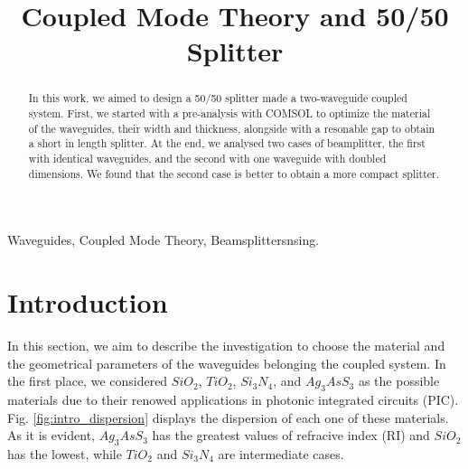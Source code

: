 \documentclass[conference, a4paper]{IEEEtran}
\begin{document}
\title{Coupled Mode Theory and 50/50 Splitter}

\author{
\and
{}
}

\maketitle

\begin{abstract}
    In this work, we aimed to design a 50/50 splitter made a two-waveguide coupled system. First, we started with a pre-analysis with COMSOL to optimize the material of the waveguides, their width and thickness, alongside with a resonable gap to obtain a short in length splitter. At the end, we analysed two cases of beamplitter, the first with identical waveguides, and the second with one waveguide with doubled dimensions. We found that the second case is better to obtain a more compact splitter.
\end{abstract}

\begin{IEEEkeywords}
    Waveguides, Coupled Mode Theory, Beamsplittersnsing.
\end{IEEEkeywords}

\section{Introduction}
\label{sec:intro}

In this section, we aim to describe the investigation to choose the material and the geometrical parameters of the waveguides belonging the coupled system. In the first place, we considered $SiO_2$, $TiO_2$, $Si_3N_4$, and $Ag_3AsS_3$ as the possible materials due to their renowed applications in photonic integrated circuits (PIC). Fig. \ref{fig:intro_dispersion} displays the dispersion of each one of these materials. As it is evident, $Ag_3AsS_3$ has the greatest values of refracive index (RI) and $SiO_2$ has the lowest, while $TiO_2$ and $Si_3N_4$ are intermediate cases. 
\end{document}
